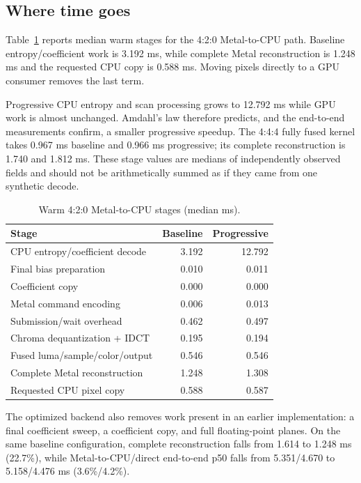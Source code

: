 \documentclass[10pt,twocolumn]{article}
\begin{document}
\subsection{Where time goes}
\label{sec:stages}

Table~\ref{tab:stages} reports median warm stages for the 4:2:0
Metal-to-CPU path.  Baseline entropy/coefficient work is 3.192 ms, while
complete Metal reconstruction is 1.248 ms and the requested CPU copy is
0.588 ms.  Moving pixels directly to a GPU consumer removes the last term.

Progressive CPU entropy and scan processing grows to 12.792 ms while GPU work
is almost unchanged.  Amdahl's law therefore predicts, and the end-to-end
measurements confirm, a smaller progressive speedup.  The 4:4:4 fully fused
kernel takes 0.967 ms baseline and 0.966 ms progressive; its complete
reconstruction is 1.740 and 1.812 ms.  These stage values are medians of
independently observed fields and should not be arithmetically summed as if
they came from one synthetic decode.

\begin{table}[t]
  \centering
  \caption{Warm 4:2:0 Metal-to-CPU stages (median ms).}
  \label{tab:stages}
  \small
  \begin{tabular}{@{}lrr@{}}
    \toprule
    Stage & Baseline & Progressive \\
    \midrule
    CPU entropy/coefficient decode & 3.192 & 12.792 \\
    Final bias preparation         & 0.010 & 0.011 \\
    Coefficient copy               & 0.000 & 0.000 \\
    Metal command encoding         & 0.006 & 0.013 \\
    Submission/wait overhead       & 0.462 & 0.497 \\
    Chroma dequantization + IDCT   & 0.195 & 0.194 \\
    Fused luma/sample/color/output & 0.546 & 0.546 \\
    Complete Metal reconstruction  & 1.248 & 1.308 \\
    Requested CPU pixel copy       & 0.588 & 0.587 \\
    \bottomrule
  \end{tabular}
\end{table}

The optimized backend also removes work present in an earlier implementation:
a final coefficient sweep, a coefficient copy, and full floating-point planes.
On the same baseline configuration, complete reconstruction falls from 1.614
to 1.248 ms (22.7\%), while Metal-to-CPU/direct end-to-end p50 falls from
5.351/4.670 to 5.158/4.476 ms (3.6\%/4.2\%).
\end{document}
